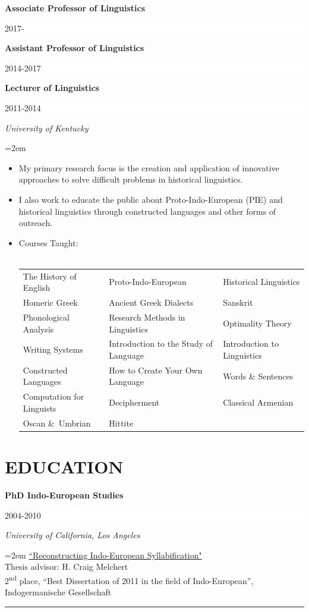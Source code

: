 \documentclass[paper=letter,fontsize=11pt,enabledeprecatedfontcommands]{scrartcl} %
\newcommand{\sepspace}{\vspace*{1em}}		%
\newcommand{\NewPart}[2]{\section*{\uppercase{#1} #2}}
\newcommand{\EducationEntry}[4]{
		\noindent \textbf{#1} \hfill      %
		\colorbox{White}{%
			\parbox{6em}{%
			\hfill\color{Black}#2}} \par  %
		\noindent \textit{#3} \par        %
		\noindent\hangindent=2em\hangafter=0 \small #4 %
		\normalsize \par}
\begin{document}
\noindent \textbf{Associate Professor of Linguistics} \hfill      %
		\colorbox{White}{%
			\parbox{6em}{%
			\hfill\color{Black}2017-$\qquad$}} \par
\noindent \textbf{\color{Black}Assistant Professor of Linguistics} \hfill      %
		\colorbox{White}{%
			\parbox{6em}{%
			\hfill\color{Black}2014-2017}} \par
\EducationEntry{{\color{Black}Lecturer of Linguistics}}{2011-2014}{University of Kentucky}
{\begin{itemize}
\item{My primary research focus is the creation and application of innovative approaches to solve difficult problems in historical linguistics.}
\item I also work to educate the public about Proto-Indo-European (PIE) and historical linguistics through constructed languages and other forms of outreach.
\item{Courses Taught:\\
\\
\begin{tabular}{l l l}
The History of English & Proto-Indo-European  & Historical Linguistics \\
Homeric Greek & Ancient Greek Dialects & Sanskrit	\\
Phonological Analysis & Research Methods in Linguistics & Optimality Theory	\\
Writing Systems & Introduction to the Study of Language & Introduction to Linguistics \\
Constructed Languages & How to Create Your Own Language & Words \& Sentences\\
Computation for Linguists & Decipherment & Classical Armenian \\
Oscan \&~Umbrian & Hittite& \\
\end{tabular}}
\end{itemize}}

\sepspace

\NewPart{Education}{}

\EducationEntry{PhD Indo-European Studies}{2004-2010}{University of California, Los Angeles}{{\href{https://uknowledge.uky.edu/cgi/viewcontent.cgi?referer=https://www.google.com/&httpsredir=1&article=1054&context=lin_facpub}{``Reconstructing Indo-European Syllabification"}\\
Thesis advisor: H. Craig Melchert\\
2\textsuperscript{nd} place, ``Best Dissertation of 2011 in the field of Indo-European”, Indogermanische Gesellschaft}
}
\noindent\rule{8cm}{0.2pt}
\end{document}
